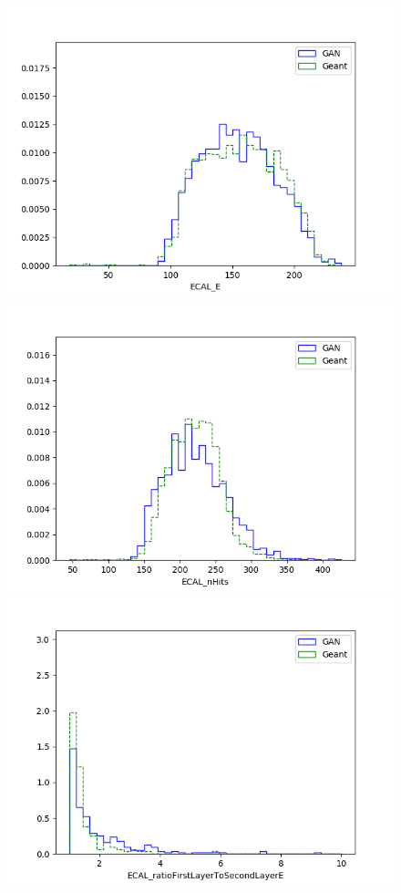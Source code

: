 \iffalse
\begin{figure}
    \centering
    \includegraphics[scale=0.3]{Images/Calo/GAN_feature_ECAL_E.png}
    \includegraphics[scale=0.3]{Images/Calo/GAN_feature_ECAL_nHits.png}
    \includegraphics[scale=0.3]{Images/Calo/GAN_feature_ECAL_ratioFirstLayerToSecondLayerE.png}

\end{figure}
